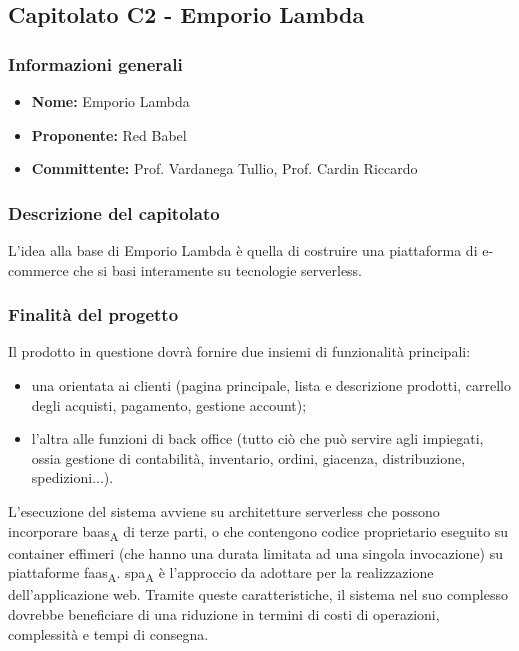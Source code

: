 \subsection{Capitolato C2 - Emporio Lambda}


\subsubsection{Informazioni generali}

\begin{itemize}
	\item{\textbf{Nome:}} Emporio Lambda
	\item{\textbf{Proponente:}} Red Babel
	\item{\textbf{Committente:}} Prof. Vardanega Tullio, Prof. Cardin Riccardo
\end{itemize}



\subsubsection{Descrizione del capitolato}

L'idea alla base di Emporio Lambda è quella di costruire una piattaforma di e-commerce che si basi interamente su tecnologie serverless.


\subsubsection{Finalità del progetto}

Il prodotto in questione dovrà fornire due insiemi di funzionalità principali:
\begin{itemize}
	\item una orientata ai clienti (pagina principale, lista e descrizione prodotti, carrello degli acquisti, pagamento, gestione account);
	\item l'altra alle funzioni di back office (tutto ciò che può servire agli impiegati, ossia gestione di contabilità, inventario, ordini, giacenza, distribuzione, spedizioni...).
\end{itemize}

L'esecuzione del sistema avviene su architetture serverless che possono incorporare \acrshort{baas}\textsubscript{A} di terze parti, o che contengono codice proprietario eseguito su container effimeri (che hanno una durata limitata ad una singola invocazione) su piattaforme \acrshort{faas}\textsubscript{A}. \acrshort{spa}\textsubscript{A} è l'approccio da adottare per la realizzazione dell'applicazione web. Tramite queste caratteristiche, il sistema nel suo complesso dovrebbe beneficiare di una riduzione in termini di costi di operazioni, complessità e tempi di consegna.


